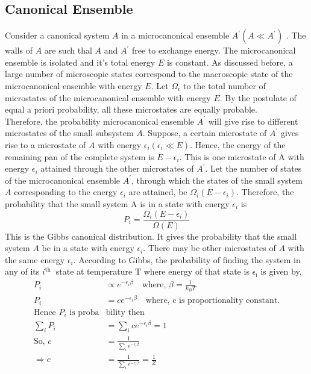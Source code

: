 \subsection{Canonical Ensemble}
Consider a canonical system $A$ in a microcanonical ensemble $A^{\prime}\left(A \ll A^{\prime}\right)$ . The walls of $A$ are such thal $A$ and $A^{\prime}$ free to exchange energy. The microcanonical ensemble is isolated and it's total energy $E$ is constant. As discussed before, a large number of microscopic states correspond to the macroscopic state of the microcanonical ensemble with energy $E$. Let $\Omega_{i}$ to the total number of microstates of the microcanonical ensemble with energy $E$. By the postulate of equal a priori probability, all these microstates are equally probable. \\Therefore, the probability
microcanonical ensemble $A^{\prime}$ will give rise to different microstates of the small subsystem $A$. Suppose, a certain microstate of $A^{\prime}$ gives rise to a microstate of $A$ with energy $\epsilon_{i}\left(\epsilon_{i} \ll E\right)$. Hence, the energy of the remaining pan of the complete system is $E-\epsilon_{i}$. This is one microstate of A with energy $\epsilon_{i}$ attained through the other microstates of $A^{\prime}$. Let the number of states of the microcanonical ensemble $A^{\prime}$, through which the states of the small system $A$ corresponding to the cnergy $\epsilon_{i}$ are attained, be $\Omega_{i}\left(E-\epsilon_{i}\right)$. Therefore, the probability that the small system A is in a state with energy $\epsilon_{i}$ is
\begin{equation*}
P_{i}=\frac{\Omega_{i}\left(E-\epsilon_{i}\right)}{\Omega(E)}
\end{equation*}
This is the Gibbs canonical distribution. It gives the probability that the small system $A$ be in a state with energy $\epsilon_{i}$. There may be other microstates of $A$ with the same energy $\epsilon_{i}$.
According to Gibbs, the probability of finding the system in any of its $i^{\text {th }}$ state at temperature $\mathrm{T}$ where energy of that state is $\epsilon_{\mathrm{i}}$ is given by,
\begin{align*}
P_{i} &\propto e^{-\epsilon_{i} \beta} \quad \text{where, }\beta=\frac{1}{k_{B} T}\\
P_{i}&=c e^{-\epsilon_{i} \beta}\quad \text{where, } \mathrm{c } \text{ is proportionality constant.}\\
\text{Hence $P_{i}$ is proba}&\text{bility then}\\
\sum_{i} P_{i}&=\sum_{i} c e^{-\epsilon_{i} \beta}=1 \\ \text {So, } c&=\frac{1}{\sum_{i} e^{-\epsilon_{i} \beta}}\\ \Rightarrow c&=\frac{1}{\sum_{i} e^{-\epsilon_{i} \beta}}=\frac{1}{Z}
\end{align*}   
